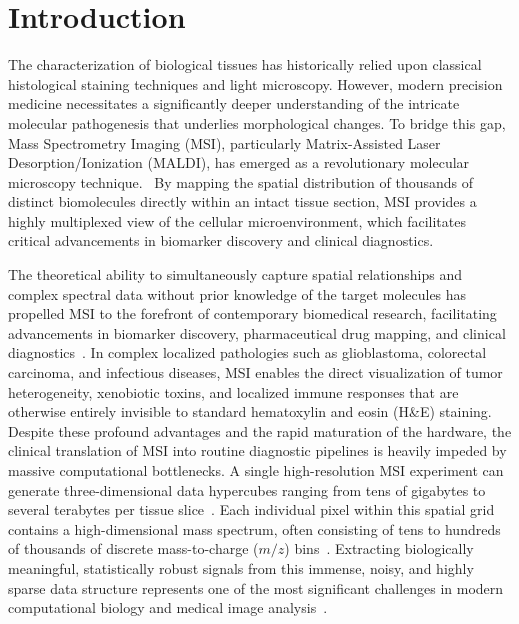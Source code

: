 \documentclass[
12pt, %
oneside, %
english, %
onehalfspacing, %
nolistspacing, %
headsepline, %
]{MastersDoctoralThesis} %
\begin{document}
%
% 
%
%
%
% 
%


\chapter{Introduction}
The characterization of biological tissues has historically relied upon classical histological staining techniques and light microscopy. However, modern precision medicine necessitates a significantly deeper understanding of the intricate molecular pathogenesis that underlies morphological changes. To bridge this gap, Mass Spectrometry Imaging (MSI), particularly Matrix-Assisted Laser Desorption/Ionization (MALDI), has emerged as a revolutionary molecular microscopy technique.~\citep{schwamborn2010molecular} By mapping the spatial distribution of thousands of distinct biomolecules directly within an intact tissue section, MSI provides a highly multiplexed view of the cellular microenvironment, which facilitates critical advancements in biomarker discovery and clinical diagnostics.~\citep{ye2013msi}

The theoretical ability to simultaneously capture spatial relationships and complex spectral data without prior knowledge of the target molecules has propelled MSI to the forefront of contemporary biomedical research, facilitating advancements in biomarker discovery, pharmaceutical drug mapping, and clinical diagnostics~\citep{abdelmoula2021peak}. In complex localized pathologies such as glioblastoma, colorectal carcinoma, and infectious diseases, MSI enables the direct visualization of tumor heterogeneity, xenobiotic toxins, and localized immune responses that are otherwise entirely invisible to standard hematoxylin and eosin (H\&E) staining. Despite these profound advantages and the rapid maturation of the hardware, the clinical translation of MSI into routine diagnostic pipelines is heavily impeded by massive computational bottlenecks. A single high-resolution MSI experiment can generate three-dimensional data hypercubes ranging from tens of gigabytes to several terabytes per tissue slice~\citep{korber2025mass}. Each individual pixel within this spatial grid contains a high-dimensional mass spectrum, often consisting of tens to hundreds of thousands of discrete mass-to-charge ($m/z$) bins~\citep{abdelmoula2021peak}. Extracting biologically meaningful, statistically robust signals from this immense, noisy, and highly sparse data structure represents one of the most significant challenges in modern computational biology and medical image analysis~\citep{zhang2025msi_infectious}.
\end{document}
